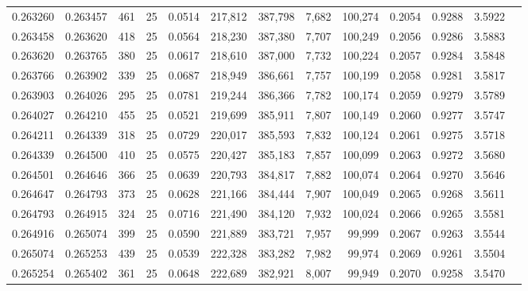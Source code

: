 \begin{tabular}{rrrrrrrrrrrrr}
0.263260 & 0.263457 &   461 &  25 &                                     0.0514 & 217,812 & 387,798 &   7,682 & 100,274 & 0.2054 & 0.9288 & 3.5922 \\
0.263458 & 0.263620 &   418 &  25 &                                     0.0564 & 218,230 & 387,380 &   7,707 & 100,249 & 0.2056 & 0.9286 & 3.5883 \\
0.263620 & 0.263765 &   380 &  25 &                                     0.0617 & 218,610 & 387,000 &   7,732 & 100,224 & 0.2057 & 0.9284 & 3.5848 \\
0.263766 & 0.263902 &   339 &  25 &                                     0.0687 & 218,949 & 386,661 &   7,757 & 100,199 & 0.2058 & 0.9281 & 3.5817 \\
0.263903 & 0.264026 &   295 &  25 &                                     0.0781 & 219,244 & 386,366 &   7,782 & 100,174 & 0.2059 & 0.9279 & 3.5789 \\
0.264027 & 0.264210 &   455 &  25 &                                     0.0521 & 219,699 & 385,911 &   7,807 & 100,149 & 0.2060 & 0.9277 & 3.5747 \\
0.264211 & 0.264339 &   318 &  25 &                                     0.0729 & 220,017 & 385,593 &   7,832 & 100,124 & 0.2061 & 0.9275 & 3.5718 \\
0.264339 & 0.264500 &   410 &  25 &                                     0.0575 & 220,427 & 385,183 &   7,857 & 100,099 & 0.2063 & 0.9272 & 3.5680 \\
0.264501 & 0.264646 &   366 &  25 &                                     0.0639 & 220,793 & 384,817 &   7,882 & 100,074 & 0.2064 & 0.9270 & 3.5646 \\
0.264647 & 0.264793 &   373 &  25 &                                     0.0628 & 221,166 & 384,444 &   7,907 & 100,049 & 0.2065 & 0.9268 & 3.5611 \\
0.264793 & 0.264915 &   324 &  25 &                                     0.0716 & 221,490 & 384,120 &   7,932 & 100,024 & 0.2066 & 0.9265 & 3.5581 \\
0.264916 & 0.265074 &   399 &  25 &                                     0.0590 & 221,889 & 383,721 &   7,957 &  99,999 & 0.2067 & 0.9263 & 3.5544 \\
0.265074 & 0.265253 &   439 &  25 &                                     0.0539 & 222,328 & 383,282 &   7,982 &  99,974 & 0.2069 & 0.9261 & 3.5504 \\
0.265254 & 0.265402 &   361 &  25 &                                     0.0648 & 222,689 & 382,921 &   8,007 &  99,949 & 0.2070 & 0.9258 & 3.5470 \\

\end{tabular}
